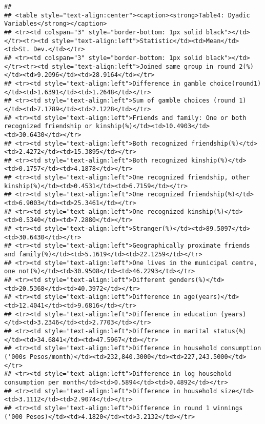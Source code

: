 \documentclass[]{tufte-handout}
\begin{document}
\begin{verbatim}
## 
## <table style="text-align:center"><caption><strong>Table4: Dyadic Variables</strong></caption>
## <tr><td colspan="3" style="border-bottom: 1px solid black"></td></tr><tr><td style="text-align:left">Statistic</td><td>Mean</td><td>St. Dev.</td></tr>
## <tr><td colspan="3" style="border-bottom: 1px solid black"></td></tr><tr><td style="text-align:left">Joined same group in round 2(%)</td><td>9.2096</td><td>28.9164</td></tr>
## <tr><td style="text-align:left">Difference in gamble choice(round1)</td><td>1.6391</td><td>1.2648</td></tr>
## <tr><td style="text-align:left">Sum of gamble choices (round 1)</td><td>7.1789</td><td>2.1228</td></tr>
## <tr><td style="text-align:left">Friends and family: One or both recognized friendship or kinship(%)</td><td>10.4903</td><td>30.6430</td></tr>
## <tr><td style="text-align:left">Both recognized friendship(%)</td><td>2.4272</td><td>15.3895</td></tr>
## <tr><td style="text-align:left">Both recognized kinship(%)</td><td>0.1757</td><td>4.1878</td></tr>
## <tr><td style="text-align:left">One recognized friendship, other kinship(%)</td><td>0.4531</td><td>6.7159</td></tr>
## <tr><td style="text-align:left">One recognized friendship(%)</td><td>6.9003</td><td>25.3461</td></tr>
## <tr><td style="text-align:left">One recognized kinship(%)</td><td>0.5340</td><td>7.2880</td></tr>
## <tr><td style="text-align:left">Stranger(%)</td><td>89.5097</td><td>30.6430</td></tr>
## <tr><td style="text-align:left">Geographically proximate friends and family(%)</td><td>5.1619</td><td>22.1259</td></tr>
## <tr><td style="text-align:left">One lives in the municipal centre, one not(%)</td><td>30.9508</td><td>46.2293</td></tr>
## <tr><td style="text-align:left">Different genders(%)</td><td>20.5368</td><td>40.3972</td></tr>
## <tr><td style="text-align:left">Difference in age(years)</td><td>12.4041</td><td>9.6816</td></tr>
## <tr><td style="text-align:left">Difference in education (years)</td><td>3.2346</td><td>2.7703</td></tr>
## <tr><td style="text-align:left">Difference in marital status(%)</td><td>34.6841</td><td>47.5967</td></tr>
## <tr><td style="text-align:left">Difference in household consumption ('000s Pesos/month)</td><td>232,840.3000</td><td>227,243.5000</td></tr>
## <tr><td style="text-align:left">Difference in log household consumption per month</td><td>0.5894</td><td>0.4892</td></tr>
## <tr><td style="text-align:left">Difference in household size</td><td>3.1112</td><td>2.9074</td></tr>
## <tr><td style="text-align:left">Difference in round 1 winnings ('000 Pesos)</td><td>4.1820</td><td>3.2132</td></tr>

\end{verbatim}
\end{document}
